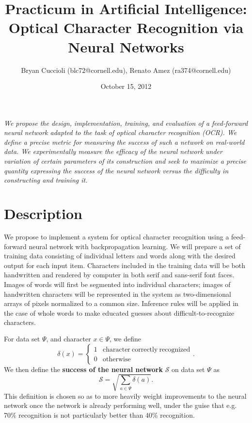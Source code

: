 \documentclass{article}
\title{Practicum in Artificial Intelligence: Optical Character Recognition via Neural Networks}
\date{October 15, 2012}
\author{Bryan Cuccioli (blc72@cornell.edu), Renato Amez (ra374@cornell.edu)}
\begin{document}
\maketitle

\emph{
We propose the design, implementation, training, and evaluation of a feed-forward neural network adapted to the task of optical character recognition (OCR). We define a precise metric for measuring the success of such a network on real-world data. We experimentally measure the efficacy of the neural network under variation of certain parameters of its construction and seek to maximize a precise quantity expressing the success of the neural network versus the difficulty in constructing and training it.
}

\section{Description}

We propose to implement a system for optical character recognition using a feed-forward neural network with backpropagation learning. We will prepare a set of training data consisting of individual letters and words along with the desired output for each input item. Characters included in the training data will be both handwritten and rendered by computer in both serif and sans-serif font faces. Images of words will first be segmented into individual characters; images of handwritten characters will be represented in the system as two-dimensional arrays of pixels normalized to a common size. Inference rules will be applied in the case of whole words to make educated guesses about difficult-to-recognize characters.

For data set $\Psi$, and character $x\in\Psi$, we define
\begin{equation}\delta(x)=\begin{cases}1 & \mathrm{character\ correctly\ recognized}\\
0 & \mathrm{otherwise}\end{cases}.\end{equation}
We then define the {\bf success of the neural network} $\mathscr{S}$ on data set $\Psi$ as
\begin{equation}\mathscr{S}=\sqrt{\sum_{a\in\Psi} \delta(a)}.\end{equation}
This definition is chosen so as to more heavily weight improvements to the neural network  once the network is already performing well, under the guise that e.g. 70\% recognition is not particularly better than 40\% recognition.
\end{document}
